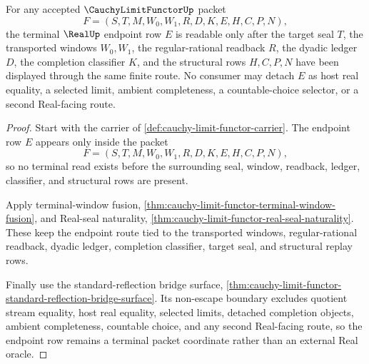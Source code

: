 \begin{theorem}
\label{thm:cauchy-limit-functor-terminal-endpoint-nonescape}
For any accepted $\CauchyLimitFunctorUp$ packet
$$
F=(S,T,M,W_0,W_1,R,D,K,E,H,C,P,N),
$$
the terminal $\RealUp$ endpoint row $E$ is readable only after the target seal $T$, the transported windows $W_0,W_1$, the regular-rational readback $R$, the dyadic ledger $D$, the completion classifier $K$, and the structural rows $H,C,P,N$ have been displayed through the same finite route. No consumer may detach $E$ as host real equality, a selected limit, ambient completeness, a countable-choice selector, or a second Real-facing route.
\end{theorem}
\begin{proof}
Start with the carrier of \autoref{def:cauchy-limit-functor-carrier}. The endpoint row $E$ appears only inside the packet
$$
F=(S,T,M,W_0,W_1,R,D,K,E,H,C,P,N),
$$
so no terminal read exists before the surrounding seal, window, readback, ledger, classifier, and structural rows are present.

Apply terminal-window fusion, \autoref{thm:cauchy-limit-functor-terminal-window-fusion}, and Real-seal naturality, \autoref{thm:cauchy-limit-functor-real-seal-naturality}. These keep the endpoint route tied to the transported windows, regular-rational readback, dyadic ledger, completion classifier, target seal, and structural replay rows.

Finally use the standard-reflection bridge surface, \autoref{thm:cauchy-limit-functor-standard-reflection-bridge-surface}. Its non-escape boundary excludes quotient stream equality, host real equality, selected limits, detached completion objects, ambient completeness, countable choice, and any second Real-facing route, so the endpoint row remains a terminal packet coordinate rather than an external Real oracle.
\end{proof}

